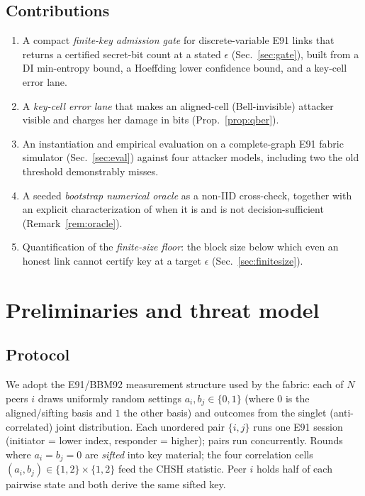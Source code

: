 \documentclass[11pt,a4paper]{article}
\newcommand{\eps}{\epsilon}
\theoremstyle{plain}
\theoremstyle{definition}
\begin{document}
\subsection{Contributions}
\begin{enumerate}
  \item A compact \emph{finite-key admission gate} for discrete-variable E91
    links that returns a certified secret-bit count at a stated $\eps$
    (Sec.~\ref{sec:gate}), built from a DI min-entropy bound, a Hoeffding lower
    confidence bound, and a key-cell error lane.
  \item A \emph{key-cell error lane} that makes an aligned-cell (Bell-invisible)
    attacker visible and charges her damage in bits
    (Prop.~\ref{prop:qber}).
  \item An instantiation and empirical evaluation on a complete-graph E91 fabric
    simulator (Sec.~\ref{sec:eval}) against four attacker models, including
    two the old threshold demonstrably misses.
  \item A seeded \emph{bootstrap numerical oracle} as a non-IID cross-check,
    together with an explicit characterization of when it is and is not
    decision-sufficient (Remark~\ref{rem:oracle}).
  \item Quantification of the \emph{finite-size floor}: the block size below
    which even an honest link cannot certify key at a target $\eps$
    (Sec.~\ref{sec:finitesize}).
\end{enumerate}

\section{Preliminaries and threat model}
\subsection{Protocol}
We adopt the E91/BBM92 measurement structure used by the fabric: each of $N$
peers $i$ draws uniformly random settings $a_i,b_j\in\{0,1\}$ (where $0$ is the
aligned/sifting basis and $1$ the other basis) and outcomes from the singlet
(anti-correlated) joint distribution. Each unordered pair $\{i,j\}$ runs one E91
session (initiator = lower index, responder = higher); pairs run concurrently.
Rounds where $a_i=b_j=0$ are \emph{sifted} into key material; the four
correlation cells $(a_i,b_j)\in\{1,2\}\times\{1,2\}$ feed the CHSH statistic.
Peer $i$ holds half of each pairwise state and both derive the same sifted key.
\end{document}
